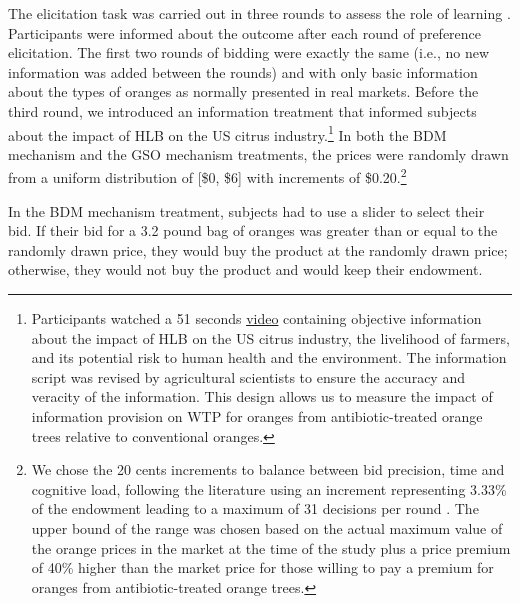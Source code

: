 \documentclass[12pt]{article}
\begin{document}
The elicitation task was carried out in three rounds to assess the role of learning \citep{corrigan2008testing, drichoutis2011role}. Participants were informed about the outcome after each round of preference elicitation.
The first two rounds of bidding were exactly the same (i.e., no new information was added between the rounds) and with only basic information about the types of oranges as normally presented in real markets. Before the third round, we introduced an information treatment that informed subjects about the impact of HLB on the US citrus industry.\footnote{Participants watched a 51 seconds \href{https://www.youtube.com/watch?v=_AqMBjB0ChM}{video} containing objective information about the impact of HLB on the US citrus industry, the livelihood of farmers, and its potential risk to human health and the environment. The information script was revised by agricultural scientists to ensure the accuracy and veracity of the information. This design allows us to measure the impact of information provision on WTP for oranges from antibiotic-treated orange trees relative to conventional oranges.} In both the BDM mechanism and the GSO mechanism treatments, the prices were randomly drawn from a uniform distribution of [\$0, \$6] with increments of \$0.20.\footnote{We chose the 20 cents increments to balance between bid precision, time and cognitive load, following the literature using an increment representing 3.33\% of the endowment leading to a maximum of 31 decisions per round \citep{li_obviously_2017, chakraborty_future_2025}. The upper bound of the range was chosen based on the actual maximum value of the orange prices in the market at the time of the study plus a price premium of 40\% higher than the market price for those willing to pay a premium for oranges from antibiotic-treated orange trees.}

In the BDM mechanism treatment, subjects had to use a slider to select their bid. If their bid for a 3.2 pound bag of oranges was greater than or equal to the randomly drawn price, they would buy the product at the randomly drawn price; otherwise, they would not buy the product and would keep their endowment.
\end{document}
